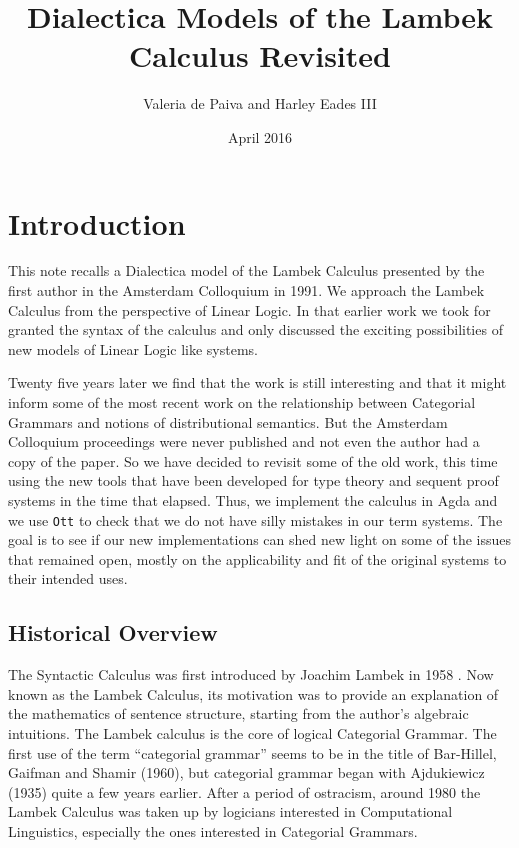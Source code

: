 \documentclass{article}
\title{Dialectica Models of the Lambek Calculus Revisited}
\author{Valeria de Paiva and Harley Eades III}
\date{April 2016}
\begin{document}
\maketitle

\section*{Introduction}

This note recalls a Dialectica model of the Lambek Calculus presented
by the first author in the Amsterdam Colloquium in 1991. We approach
the Lambek Calculus from the perspective of Linear Logic. In that
earlier work we took for granted the syntax of the calculus and only
discussed the exciting possibilities of new models of Linear Logic
like systems.


Twenty five years later we find that the work is still interesting and
that it might inform some of the most recent work on the relationship
between Categorial Grammars and notions of distributional
semantics. But the Amsterdam Colloquium proceedings were never
published and not even the author had a copy of the paper. So we have
decided to revisit some of the old work, this time using the new tools
that have been developed for type theory and sequent proof systems in
the time that elapsed. Thus, we implement the calculus in Agda and we
use \texttt{Ott} \cite{Sewell:2010} to check that we do not have silly
mistakes in our term systems. The goal is to see if our new
implementations can shed new light on some of the issues that remained
open, mostly on the applicability and fit of the original systems to
their intended uses.

\subsection*{Historical Overview}
The Syntactic Calculus was first introduced by Joachim Lambek in 1958
\cite{Lambek1958}. Now known as the Lambek Calculus, its motivation
was to provide an explanation of the mathematics of sentence
structure, starting from the author's algebraic intuitions. The Lambek
calculus is the core of logical Categorial Grammar.  The first use of
the term “categorial grammar” seems to be in the title of Bar-Hillel,
Gaifman and Shamir (1960), but categorial grammar began with
Ajdukiewicz (1935) quite a few years earlier. After a period of
ostracism, around 1980 the Lambek Calculus was taken up by logicians
interested in Computational Linguistics, especially the ones
interested in Categorial Grammars. %
\end{document}
